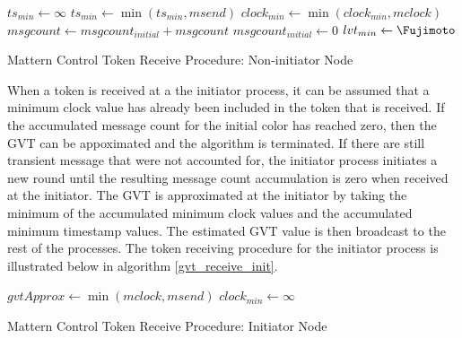 \documentclass[11pt]{book}
\begin{document}
\begin{algorithm}
\DontPrintSemicolon
\SetAlgoVlined
{}
     {
        $ts_{min} \gets \infty$\;
         
    }
    $ts_{min} \gets \min{(ts_{min}, msend)}$\;
    $clock_{min} \gets \min{(clock_{min}, mclock)}$\;
    $msgcount \gets msgcount_{initial} + msgcount$\;
    $msgcount_{initial} \gets 0$\;
    $lvt_{min} \gets \Fujimoto$\;
    \;
\caption{Mattern Control Token Receive Procedure: Non-initiator Node}\label{gvt_receive_noninit}
\end{algorithm}

When a token is received at a the initiator process, it can be assumed that a minimum clock
value has already been included in the token that is received. If the accumulated message count
for the initial color has reached zero, then the GVT can be appoximated and the algorithm
is terminated. If there are still transient message that were not accounted for, the initiator
process initiates a new round until the resulting message count accumulation is zero
when received at the initiator. The GVT is approximated at the initiator by taking the
minimum of the accumulated minimum clock values and the accumulated minimum timestamp values.
The estimated GVT value is then broadcast to the rest of the processes. The token receiving procedure
for the initiator process is illustrated below in algorithm \ref{gvt_receive_init}.

\begin{algorithm}
\DontPrintSemicolon
\SetAlgoVlined
{}
     {
        $gvtApprox \gets \min{(mclock, msend)}$\;
        \SendGVTUpdate{}\;
         
        $clock_{min} \gets \infty$\;
    } 
\caption{Mattern Control Token Receive Procedure: Initiator Node}\label{gvt_receive_init}
\end{algorithm}
\end{document}
